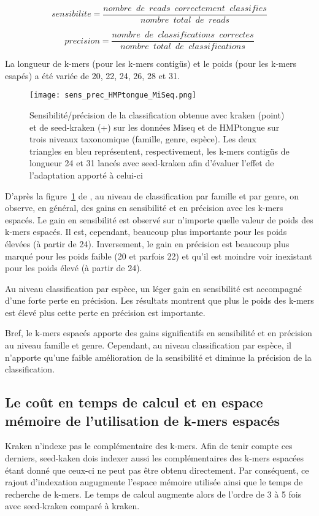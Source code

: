 \begin{equation}
\label{sens}          
sensibilite=\frac{nombre \phantom{a} de \phantom{a} reads \phantom{a} correctement \phantom{a} classifies}{nombre \phantom{a} total \phantom{a} de \phantom{a} reads}
\end{equation}          

\begin{equation}
\label{prec}          
precision=\frac{nombre \phantom{a} de \phantom{a} classifications \phantom{a} correctes}{nombre \phantom{a} total \phantom{a} de \phantom{a} classifications}
\end{equation}          

La longueur de k-mers (pour les k-mers contigüs) et le poids (pour les k-mers esapés) a été variée de 20, 22, 24, 26, 28 et 31.

\begin{figure}
  \texttt{[image: sens\_prec\_HMPtongue\_MiSeq.png]}
  \caption{ \label{sens_prec_HMPtongue_MiSeq} Sensibilité/précision de la classification obtenue avec kraken (point) et de seed-kraken (+) sur les données Miseq et de HMPtongue sur trois niveaux taxonomique (famille, genre, espèce). Les deux triangles en bleu représentent, respectivement, les k-mers contigüs de longueur 24 et 31 lancés avec seed-kraken afin d'évaluer l'effet de l'adaptation apporté à celui-ci} 
\end{figure}

D'après la figure~\ref{sens_prec_HMPtongue_MiSeq} de \cite{Brinda2015}, au niveau de classification par famille et par genre, on observe, en général, des gains en sensibilité et en précision avec les k-mers espacés.
Le gain en sensibilité est observé sur n'importe quelle valeur de poids des k-mers espacés. Il est, cependant, beaucoup plus importante pour les poids élevées (à partir de 24). 
Inversement, le gain en précision est beaucoup plus marqué pour les poids faible (20 et parfois 22) et qu'il est moindre voir inexistant pour les poids élevé (à partir de 24).

Au niveau classification par espèce, un léger gain en sensibilité est accompagné d'une forte perte en précision. Les résultats montrent que plus le poids des k-mers est élevé plus cette perte en précision est importante.

Bref, le k-mers espacés apporte des gains significatifs en sensibilité et en précision au niveau famille et genre. Cependant, au niveau classification par espèce, il n'apporte qu'une faible amélioration de la sensibilité et diminue la précision de la classification.

 
\subsection{Le coût en temps de calcul et en espace mémoire de l'utilisation de k-mers espacés}

Kraken n'indexe pas le complémentaire des k-mers. Afin de tenir compte ces derniers, seed-kaken dois indexer aussi les complémentaires des k-mers espacées étant donné que ceux-ci ne peut pas être obtenu directement. Par conséquent, ce rajout d'indexation augugmente l'espace mémoire utilisée ainsi que le temps de recherche de k-mers.
Le temps de calcul augmente alors de l'ordre de 3 à 5 fois avec seed-kraken comparé à kraken.